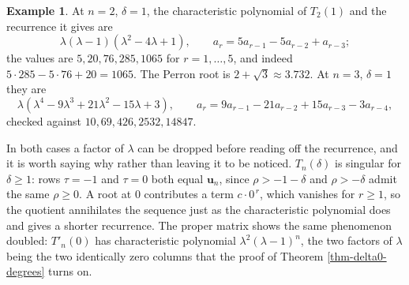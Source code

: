 \documentclass[11pt, a4paper, abstract=yes]{scrartcl}
\theoremstyle{definition}
\newtheorem{mexample}[definition]{Example}
\theoremstyle{remark}
\theoremstyle{plain}
\newcommand{\vek}[1]{\boldsymbol{#1}}
\begin{document}
\begin{mexample}
At \(n=2\), \(\delta=1\), the characteristic polynomial of \(T_2(1)\) and the recurrence it gives are
\[
  \lambda(\lambda-1)(\lambda^2-4\lambda+1),\qquad a_r=5a_{r-1}-5a_{r-2}+a_{r-3};
\]
the values are
\(5,20,76,285,1065\) for \(r=1,\dots,5\), and indeed \(5\cdot285-5\cdot76+20=1065\). The Perron root
is \(2+\sqrt3\approx3.732\). At \(n=3\), \(\delta=1\) they are
\[
  \lambda(\lambda^4-9\lambda^3+21\lambda^2-15\lambda+3),\qquad
  a_r=9a_{r-1}-21a_{r-2}+15a_{r-3}-3a_{r-4},
\]
checked against \(10,69,426,2532,14847\).

In both cases a factor of \(\lambda\) can be dropped before reading off the recurrence, and it is
worth saying why rather than leaving it to be noticed. \(T_n(\delta)\) is singular for
\(\delta\ge1\): rows \(\tau=-1\) and \(\tau=0\) both equal \(\vek u_n\), since
\(\rho>-1-\delta\) and \(\rho>-\delta\) admit the same \(\rho\ge0\). A root at \(0\)
contributes a term \(c\cdot0^{\,r}\), which vanishes for \(r\ge1\), so the quotient annihilates
the sequence just as the characteristic polynomial does and gives a shorter recurrence. The proper
matrix shows the same phenomenon doubled: \(T'_n(0)\) has characteristic polynomial
\(\lambda^2(\lambda-1)^n\), the two factors of \(\lambda\) being the two identically zero
columns that the proof of Theorem \ref{thm-delta0-degrees} turns on.


\end{mexample}
\end{document}
